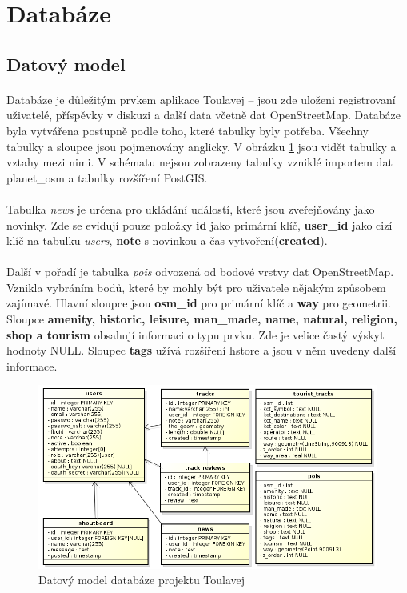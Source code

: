 \documentclass[11pt,a4paper,titlepage,oneside]{book}
\begin{document}
		\section{Databáze}
			\subsection{Datový model}
				\paragraph{} Databáze je důležitým prvkem aplikace Toulavej -- jsou zde uloženi registrovaní uživatelé, příspěvky v diskuzi a další data včetně dat OpenStreetMap. Databáze byla vytvářena postupně podle toho, které tabulky byly potřeba. Všechny tabulky a sloupce jsou pojmenovány anglicky. V obrázku \ref{fig:db} jsou vidět tabulky a vztahy mezi nimi. V schématu nejsou zobrazeny tabulky vzniklé importem dat planet\_osm a tabulky rozšíření PostGIS. 
				\paragraph{}Tabulka \textit{news} je určena pro ukládání událostí, které jsou zveřejňovány jako novinky. Zde se evidují pouze položky \textbf{id} jako primární klíč, \textbf{user\_id} jako cizí klíč na tabulku \textit{users}, \textbf{note} s novinkou a čas vytvoření(\textbf{created}).
				\paragraph{}Další v pořadí je tabulka \textit{pois} odvozená od bodové vrstvy dat OpenStreetMap. Vznikla vybráním bodů, které by mohly být pro uživatele nějakým způsobem zajímavé. Hlavní sloupce jsou \textbf{osm\_id} pro primární klíč a \textbf{way} pro geometrii. Sloupce \textbf{amenity, historic, leisure, man\_made, name, natural, religion, shop a tourism} obsahují informaci o typu prvku. Zde je velice častý výskyt hodnoty NULL. Sloupec \textbf{tags} užívá rozšíření hstore a jsou v něm uvedeny další informace.
		\begin{figure}[!h]
			\begin{center}
				\includegraphics[width=13cm]{obrazky/datovy_model.png}
				\caption{Datový model databáze projektu Toulavej}
				\label{fig:db}
			\end{center}
		\end{figure}
\end{document}
